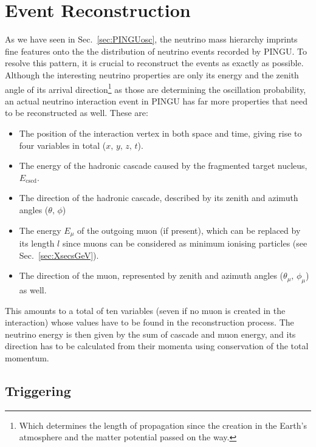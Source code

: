 \section{Event Reconstruction}
\label{sec:EvtReco}

As we have seen in Sec.~\ref{sec:PINGUosc}, the neutrino mass hierarchy
imprints fine features onto the the distribution of neutrino events recorded by
PINGU. To resolve this pattern,
it is crucial to
reconstruct the events as exactly as possible. Although the interesting neutrino
properties are only its energy and the zenith angle of its arrival
direction\footnote{Which determines the length of propagation since the
creation in the Earth's atmosphere and the matter potential passed on the way.}
as those are determining the oscillation probability, an actual neutrino
interaction event in PINGU has far more properties that need to be
reconstructed as well. These are:
\begin{itemize}
 \item The position of the interaction vertex in both space and time, giving
  rise to four variables in total ($x,\,y,\,z,\,t$).
 \item The energy of the hadronic cascade caused by the fragmented target
  nucleus, $E_\mathrm{cscd}$.
 \item The direction of the hadronic cascade, described by its zenith and
  azimuth angles ($\theta,\,\phi$)
 \item The energy $E_\mu$ of the outgoing muon (if present), which can be
  replaced by its length $l$ since muons can be
  considered as minimum ionising particles (see Sec.~\ref{sec:XsecsGeV}).
 \item The direction of the muon, represented by zenith and azimuth angles
  ($\theta_\mu,\,\phi_\mu$) as well.
\end{itemize}
This amounts to a total of ten variables (seven if no muon is created in the
interaction) whose values have to be found in the reconstruction process. The
neutrino energy is then given by the sum of cascade and muon energy, and its
direction has to be calculated from their momenta using conservation of the
total momentum. 

\subsection{Triggering}
\label{sec:reco_trigger}

